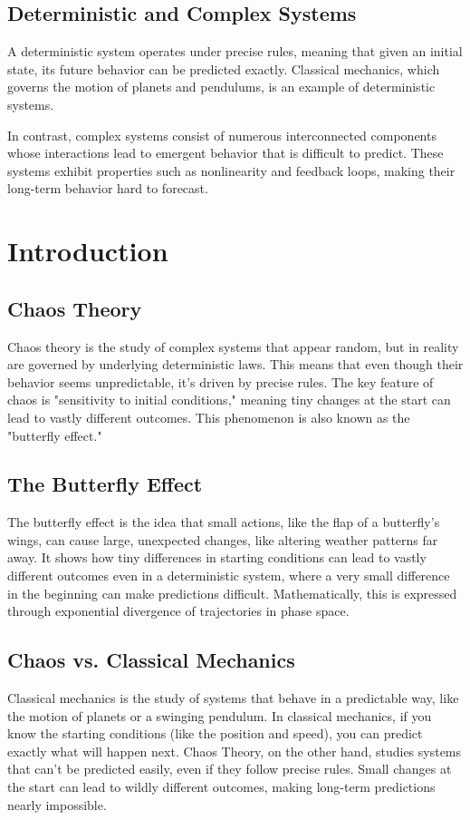\documentclass[12pt]{article}
\begin{document}
\subsection{Deterministic and Complex Systems}
A deterministic system operates under precise rules, meaning that given an initial state, its future behavior can be predicted exactly. Classical mechanics, which governs the motion of planets and pendulums, is an example of deterministic systems.

In contrast, complex systems consist of numerous interconnected components whose interactions lead to emergent behavior that is difficult to predict. These systems exhibit properties such as nonlinearity and feedback loops, making their long-term behavior hard to forecast.

\section{Introduction}

\subsection{Chaos Theory}
Chaos theory is the study of complex systems that appear random, but in reality are governed by underlying deterministic laws. This means that even though their behavior seems unpredictable, it's driven by precise rules. The key feature of chaos is "sensitivity to initial conditions," meaning tiny changes at the start can lead to vastly different outcomes. This phenomenon is also known as the "butterfly effect."

\subsection{The Butterfly Effect}
The butterfly effect is the idea that small actions, like the flap of a butterfly’s wings, can cause large, unexpected changes, like altering weather patterns far away. It shows how tiny differences in starting conditions can lead to vastly different outcomes even in a deterministic system, where a very small difference in the beginning can make predictions difficult. Mathematically, this is expressed through exponential divergence of trajectories in phase space.

\subsection{Chaos vs. Classical Mechanics}
Classical mechanics is the study of systems that behave in a predictable way, like the motion of planets or a swinging pendulum. In classical mechanics, if you know the starting conditions (like the position and speed), you can predict exactly what will happen next. Chaos Theory, on the other hand, studies systems that can’t be predicted easily, even if they follow precise rules. Small changes at the start can lead to wildly different outcomes, making long-term predictions nearly impossible.
\end{document}
